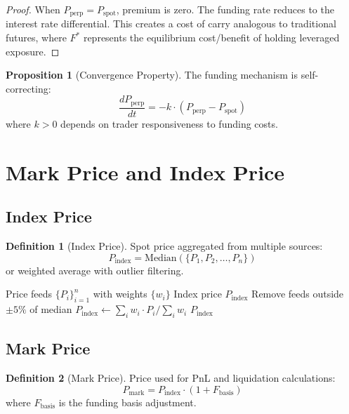 \documentclass[11pt,a4paper]{article}
\theoremstyle{definition}
\newtheorem{definition}{Definition}
\newtheorem{proposition}{Proposition}
\begin{document}
\begin{proof}
When $P_{\text{perp}} = P_{\text{spot}}$, premium is zero. The funding rate reduces to the interest rate differential. This creates a cost of carry analogous to traditional futures, where $F^*$ represents the equilibrium cost/benefit of holding leveraged exposure.
\end{proof}

\begin{proposition}[Convergence Property]
The funding mechanism is self-correcting:
\begin{equation}
\frac{dP_{\text{perp}}}{dt} = -k \cdot (P_{\text{perp}} - P_{\text{spot}})
\end{equation}
where $k > 0$ depends on trader responsiveness to funding costs.
\end{proposition}

\section{Mark Price and Index Price}

\subsection{Index Price}

\begin{definition}[Index Price]
Spot price aggregated from multiple sources:
\begin{equation}
P_{\text{index}} = \text{Median}(\{P_1, P_2, \ldots, P_n\})
\end{equation}
or weighted average with outlier filtering.
\end{definition}

\begin{algorithm}
\caption{Index Price Calculation}
\begin{algorithmic}[1]
\Require Price feeds $\{P_i\}_{i=1}^n$ with weights $\{w_i\}$
\Ensure Index price $P_{\text{index}}$
\State Remove feeds outside $\pm 5\%$ of median
\State $P_{\text{index}} \gets \sum_i w_i \cdot P_i / \sum_i w_i$
\State \Return $P_{\text{index}}$
\end{algorithmic}
\end{algorithm}

\subsection{Mark Price}

\begin{definition}[Mark Price]
Price used for PnL and liquidation calculations:
\begin{equation}
P_{\text{mark}} = P_{\text{index}} \cdot (1 + F_{\text{basis}})
\end{equation}
where $F_{\text{basis}}$ is the funding basis adjustment.
\end{definition}
\end{document}
